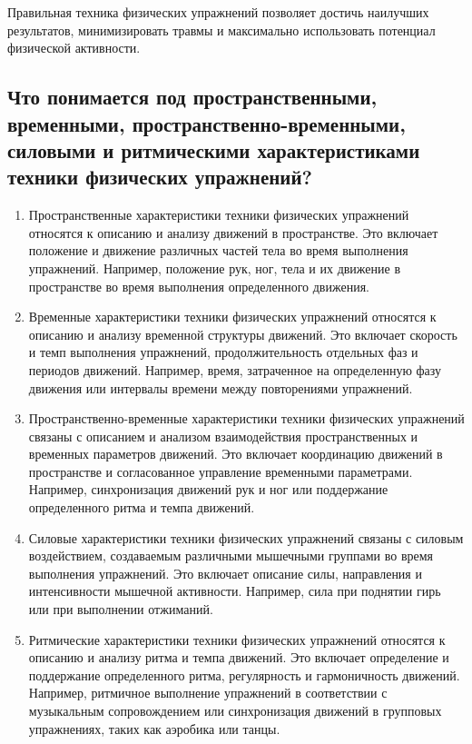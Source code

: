Правильная техника физических упражнений позволяет достичь наилучших результатов, минимизировать травмы и максимально использовать потенциал физической активности.

\subsection{Что понимается под пространственными, временными, пространственно-временными, силовыми и ритмическими характеристиками техники физических упражнений?}

\begin{enumerate}
    \item Пространственные характеристики техники физических упражнений относятся к описанию и анализу движений в пространстве. Это включает положение и движение различных частей тела во время выполнения упражнений. Например, положение рук, ног, тела и их движение в пространстве во время выполнения определенного движения.
    \item Временные характеристики техники физических упражнений относятся к описанию и анализу временной структуры движений. Это включает скорость и темп выполнения упражнений, продолжительность отдельных фаз и периодов движений. Например, время, затраченное на определенную фазу движения или интервалы времени между повторениями упражнений.
    \item Пространственно-временные характеристики техники физических упражнений связаны с описанием и анализом взаимодействия пространственных и временных параметров движений. Это включает координацию движений в пространстве и согласованное управление временными параметрами. Например, синхронизация движений рук и ног или поддержание определенного ритма и темпа движений.
    \item Силовые характеристики техники физических упражнений связаны с силовым воздействием, создаваемым различными мышечными группами во время выполнения упражнений. Это включает описание силы, направления и интенсивности мышечной активности. Например, сила при поднятии гирь или при выполнении отжиманий.
    \item Ритмические характеристики техники физических упражнений относятся к описанию и анализу ритма и темпа движений. Это включает определение и поддержание определенного ритма, регулярность и гармоничность движений. Например, ритмичное выполнение упражнений в соответствии с музыкальным сопровождением или синхронизация движений в групповых упражнениях, таких как аэробика или танцы.
\end{enumerate}
